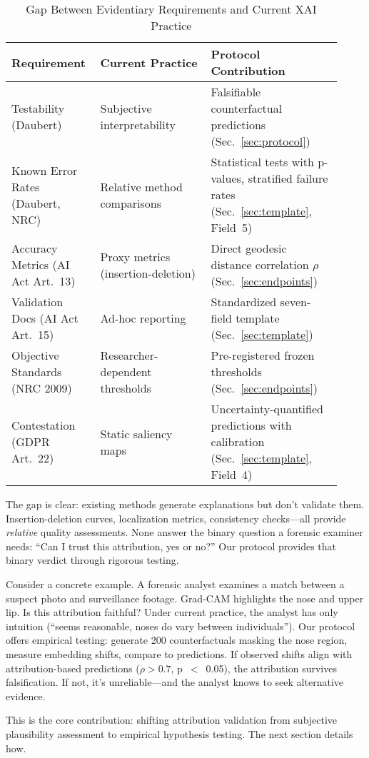 \begin{table}[!t]
\centering
\caption{Gap Between Evidentiary Requirements and Current XAI Practice}
\label{tab:gap_analysis}
\begin{tabular}{@{}p{0.22\linewidth}p{0.32\linewidth}p{0.38\linewidth}@{}}
\toprule
\textbf{Requirement} & \textbf{Current Practice} & \textbf{Protocol Contribution} \\ \midrule
Testability (Daubert) & Subjective interpretability & Falsifiable counterfactual predictions (Sec.~\ref{sec:protocol}) \\ \midrule
Known Error Rates (Daubert, NRC) & Relative method comparisons & Statistical tests with p-values, stratified failure rates (Sec.~\ref{sec:template}, Field~5) \\ \midrule
Accuracy Metrics (AI Act Art.~13) & Proxy metrics (insertion-deletion) & Direct geodesic distance correlation $\rho$ (Sec.~\ref{sec:endpoints}) \\ \midrule
Validation Docs (AI Act Art.~15) & Ad-hoc reporting & Standardized seven-field template (Sec.~\ref{sec:template}) \\ \midrule
Objective Standards (NRC 2009) & Researcher-dependent thresholds & Pre-registered frozen thresholds (Sec.~\ref{sec:endpoints}) \\ \midrule
Contestation (GDPR Art.~22) & Static saliency maps & Uncertainty-quantified predictions with calibration (Sec.~\ref{sec:template}, Field~4) \\ \bottomrule
\end{tabular}
\end{table}

The gap is clear: existing methods generate explanations but don't validate them. Insertion-deletion curves, localization metrics, consistency checks—all provide \textit{relative} quality assessments. None answer the binary question a forensic examiner needs: ``Can I trust this attribution, yes or no?'' Our protocol provides that binary verdict through rigorous testing.

Consider a concrete example. A forensic analyst examines a match between a suspect photo and surveillance footage. Grad-CAM highlights the nose and upper lip. Is this attribution faithful? Under current practice, the analyst has only intuition (``seems reasonable, noses do vary between individuals''). Our protocol offers empirical testing: generate 200 counterfactuals masking the nose region, measure embedding shifts, compare to predictions. If observed shifts align with attribution-based predictions ($\rho > 0.7$, p~$<$~0.05), the attribution survives falsification. If not, it's unreliable—and the analyst knows to seek alternative evidence.

This is the core contribution: shifting attribution validation from subjective plausibility assessment to empirical hypothesis testing. The next section details how.
